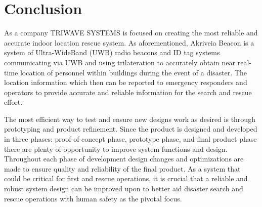 

\setcounter{section}{5}
\section{Conclusion}

\bigskip
As a company TRIWAVE SYSTEMS is focused on creating the most reliable and accurate indoor location rescue system. As aforementioned, Akriveia Beacon is a system of Ultra-WideBand (UWB) radio beacons and ID tag systems communicating via UWB and using trilateration to accurately obtain near real-time location of personnel within buildings during the event of a disaster. The location information which then can be reported to emergency responders and operators to provide accurate and reliable information for the search and rescue effort. 

\bigskip
The most efficient way to test and ensure new designs work as desired is through prototyping and product refinement. Since the product is designed and developed in three phases: proof-of-concept phase, prototype phase, and final product phase there are plenty of opportunity to improve system functions and design. Throughout each phase of development design changes and optimizations are made to ensure quality and reliability of the final product. As a system that could be critical for first and rescue operations, it is crucial that a reliable and robust system design can be improved upon to better aid disaster search and rescue operations with human safety as the pivotal focus.
